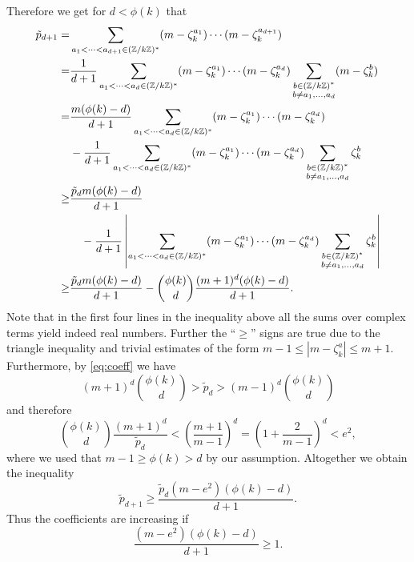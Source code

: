 Therefore we get for $d<\phi(k)$ that
\begin{align*}
\tilde p_{d+1}
=&\sum_{a_1<\cdots<a_{d+1}\in({\mathbb Z}/k{\mathbb Z})^*}(m-\zeta_k^{a_1})\cdots(m-\zeta_k^{a_{d+1}})\\
=&\frac{1}{d+1}\sum_{a_1<\cdots<a_{d}\in({\mathbb Z}/k{\mathbb Z})^*}(m-\zeta_k^{a_1})\cdots(m-\zeta_k^{a_{d}})\sum_{\substack{b\in({\mathbb Z}/k{\mathbb Z})^*\\ b\neq 
a_1,\ldots,a_d}}(m-\zeta_k^b)\\
=&\frac{m(\phi(k)-d)}{d+1}\sum_{a_1<\cdots<a_{d}\in({\mathbb Z}/k{\mathbb Z})^*}(m-\zeta_k^{a_1})\cdots(m-\zeta_k^{a_{d}})\\
&-\frac{1}{d+1}\sum_{a_1<\cdots<a_{d}\in({\mathbb Z}/k{\mathbb Z})^*}(m-\zeta_k^{a_1})\cdots(m-\zeta_k^{a_{d}})\sum_{\substack{b\in({\mathbb Z}/k{\mathbb Z})^*\\ b\neq 
a_1,\ldots,a_d}}\zeta_k^b\\
\geq& \frac{\tilde p_dm(\phi(k)-d)}{d+1}\\
&\quad-\frac{1}{d+1}\left|\sum_{a_1<\cdots<a_{d}\in({\mathbb Z}/k{\mathbb Z})^*}(m-\zeta_k^{a_1})\cdots(m-\zeta_k^{a_{d}})\sum_{\substack{b\in({\mathbb Z}/k{\mathbb Z})^*\\
b\neq a_1,\ldots,a_d}}\zeta_k^b \right|\\
\geq & \frac{\tilde p_dm(\phi(k)-d)}{d+1}-{\phi(k) \choose {d}}\frac{(m+1)^d(\phi(k)-d)}{d+1}.
\end{align*}
Note that in the first four lines in the inequality above all the sums
over complex terms yield indeed real numbers. Further the ``$\geq$''
signs are true due to the triangle inequality and trivial estimates of
the form $m-1\leq|m-\zeta_k^a|\leq m+1$. Furthermore, by
\eqref{eq:coeff} we have
\[(m+1)^d{\phi(k) \choose {d}}>\tilde p_d>(m-1)^d{\phi(k) \choose
  {d}}\] and therefore
\[\binom{\phi(k)}{d}\frac{(m+1)^d}{\tilde p_d}<\left(\frac{m+1}{m-1}\right)^d=\left(1+\frac{2}{m-1}\right)^d<e^2,\]
where we used that $m-1\geq\phi(k)>d$ by our assumption. Altogether we
obtain the inequality
\[\tilde p_{d+1}\geq \frac{\tilde p_d(m-e^2)(\phi(k)-d)}{d+1}.\]
Thus the coefficients are increasing if 
\begin{equation}\label{eq:bound-m-d}
\frac{(m-e^2)(\phi(k)-d)}{d+1}\geq1.
\end{equation}

